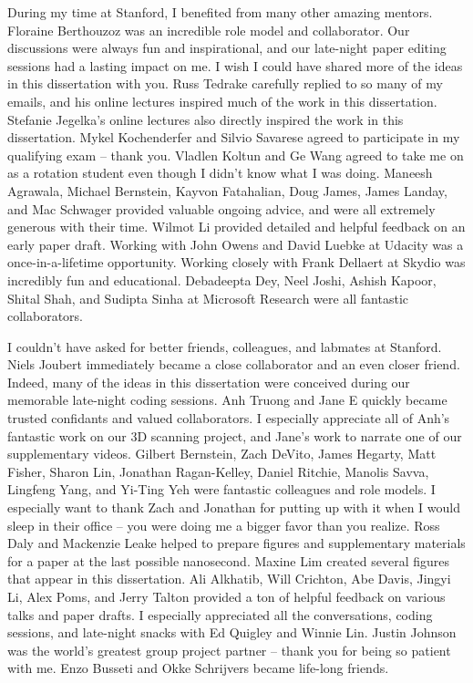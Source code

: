 During my time at Stanford, I benefited from many other amazing mentors.
Floraine Berthouzoz was an incredible role model and collaborator.
Our discussions were always fun and inspirational, and our late-night paper editing sessions had a lasting impact on me.
I wish I could have shared more of the ideas in this dissertation with you.
Russ Tedrake carefully replied to so many of my emails, and his online lectures inspired much of the work in this dissertation.
Stefanie Jegelka's online lectures also directly inspired the work in this dissertation.
Mykel Kochenderfer and Silvio Savarese agreed to participate in my qualifying exam -- thank you.
Vladlen Koltun and Ge Wang agreed to take me on as a rotation student even though I didn't know what I was doing.
Maneesh Agrawala, Michael Bernstein, Kayvon Fatahalian, Doug James, James Landay, and Mac Schwager provided valuable ongoing advice, and were all extremely generous with their time.
Wilmot Li provided detailed and helpful feedback on an early paper draft.
Working with John Owens and David Luebke at Udacity was a once-in-a-lifetime opportunity.
Working closely with Frank Dellaert at Skydio was incredibly fun and educational.
Debadeepta Dey, Neel Joshi, Ashish Kapoor, Shital Shah, and Sudipta Sinha at Microsoft Research were all fantastic collaborators.

I couldn't have asked for better friends, colleagues, and labmates at Stanford.
Niels Joubert immediately became a close collaborator and an even closer friend.
Indeed, many of the ideas in this dissertation were conceived during our memorable late-night coding sessions.
Anh Truong and Jane E quickly became trusted confidants and valued collaborators.
I especially appreciate all of Anh's fantastic work on our 3D scanning project, and Jane's work to narrate one of our supplementary videos.
Gilbert Bernstein, Zach DeVito, James Hegarty, Matt Fisher, Sharon Lin, Jonathan Ragan-Kelley, Daniel Ritchie, Manolis Savva, Lingfeng Yang, and Yi-Ting Yeh were fantastic colleagues and role models.
I especially want to thank Zach and Jonathan for putting up with it when I would sleep in their office -- you were doing me a bigger favor than you realize.
Ross Daly and Mackenzie Leake helped to prepare figures and supplementary materials for a paper at the last possible nanosecond.
Maxine Lim created several figures that appear in this dissertation.
Ali Alkhatib, Will Crichton, Abe Davis, Jingyi Li, Alex Poms, and Jerry Talton provided a ton of helpful feedback on various talks and paper drafts.
I especially appreciated all the conversations, coding sessions, and late-night snacks with Ed Quigley and Winnie Lin.
Justin Johnson was the world's greatest group project partner -- thank you for being so patient with me.
Enzo Busseti and Okke Schrijvers became life-long friends.

